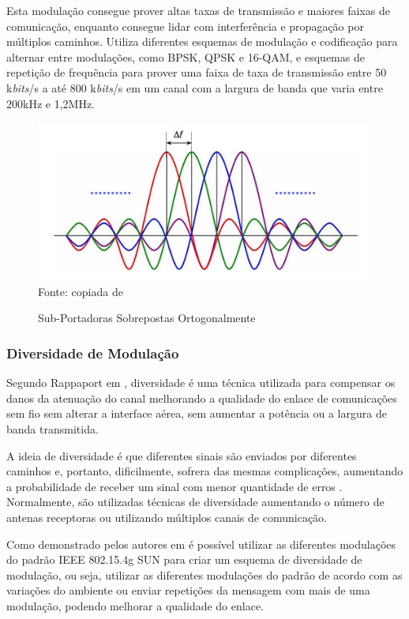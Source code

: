 Esta modulação consegue prover altas taxas de transmissão e maiores faixas de comunicação, enquanto consegue lidar com interferência e propagação por múltiplos caminhos. Utiliza diferentes esquemas de modulação e codificação para alternar entre modulações, como BPSK, QPSK e 16-QAM, e esquemas de repetição de frequência para prover uma faixa de taxa de transmissão entre 50 k\emph{bits}/s a até 800 k\emph{bits}/s em um canal com a largura de banda que varia entre 200kHz e 1,2MHz.

\begin{figure}[ht]
      \begin{center}
            \caption{Sub-Portadoras Sobrepostas Ortogonalmente}
            \includegraphics[width=12cm]{./sections/textual/chapters/images/ofdm.jpg}\\
            Fonte: copiada de \cite{figOFDM}
            \label{fig:ofdm}
      \end{center}
\end{figure}

\subsubsection{Diversidade de Modulação}
Segundo Rappaport em \cite{rappaport2009}, diversidade é uma técnica utilizada para compensar os danos da atenuação do canal melhorando a qualidade do enlace de comunicações sem fio sem alterar a interface aérea, sem aumentar a potência ou a largura de banda transmitida.

A ideia de diversidade é que diferentes sinais são enviados por diferentes caminhos e, portanto, dificilmente, sofrera das mesmas complicações, aumentando a probabilidade de receber um sinal com menor quantidade de erros \cite{goldsmith2005wireless}. Normalmente, são utilizadas técnicas de diversidade aumentando o número de antenas receptoras ou utilizando múltiplos canais de comunicação.

Como demonstrado pelos autores em \cite{gomes2020improving} é possível utilizar as diferentes modulações do padrão IEEE 802.15.4g SUN para criar um esquema de diversidade de modulação, ou seja, utilizar as diferentes modulações do padrão de acordo com as variações do ambiente ou enviar repetições da mensagem com mais de uma modulação, podendo melhorar a qualidade do enlace.

